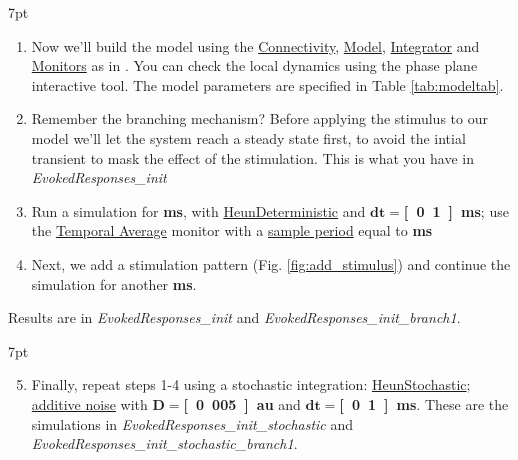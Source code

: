 \documentclass{tufte-handout}
\newenvironment{simulation}{%
  \def\FrameCommand{%
    \hspace{1pt}%
    {\color{ForestGreen}\vrule width 2pt}%
    {\color{simulationshade}\vrule width 4pt}%
    \colorbox{simulationshade}%
  }%
  \MakeFramed{\advance\hsize-\width\FrameRestore}%
  \noindent\hspace{-4.55pt}%
  \begin{adjustwidth}{}{7pt}%
  \vspace{2pt}\vspace{2pt}%
}
{%
  \vspace{2pt}\end{adjustwidth}\endMakeFramed%
}
\begin{document}
\begin{simulation}
\begin{enumerate}
\item Now we'll build the model using the \underline{Connectivity}, \underline{Model}, \underline{Integrator} and \underline{Monitors} as in \citep{Sanz-Leon_2013}. You can check the local dynamics using the phase plane interactive tool. The model parameters are specified in Table \ref{tab:modeltab}.
\item Remember the branching mechanism? Before applying the stimulus to our model we'll let the system reach a steady state first, to avoid the intial transient to mask the effect of the stimulation. This is what you have in \textit{EvokedResponses\_init}
\item Run a simulation for \textbf{\unit[1000]{ms}}, with \underline{HeunDeterministic} and $\mathbf{dt=}$\textbf{\unit[0.1]{ms}}; use the \underline{Temporal Average} monitor with a \underline{sample period} equal to \textbf{\unit[1]{ms}}
\item Next, we add a stimulation pattern  (Fig. \ref{fig:add_stimulus}) and continue the simulation for another \textbf{\unit[4000]{ms}}.
\end{enumerate}
\end{simulation}




 Results are in \textit{EvokedResponses\_init} and  \textit{EvokedResponses\_init\_branch1}.

\begin{simulation}
\begin{enumerate}[resume]
\setcounter{enumi}{4}
\item Finally, repeat steps 1-4 using a stochastic integration: \underline{HeunStochastic}; \underline{additive noise} with $\mathbf{D}=$\textbf{\unit[0.005]{au}} and $\mathbf{dt=}$\textbf{\unit[0.1]{ms}}.
These are the simulations in \textit{EvokedResponses\_init\_stochastic} and \textit{EvokedResponses\_init\_stochastic\_branch1}.
\end{enumerate}
\end{simulation}


\newpage
\end{document}
